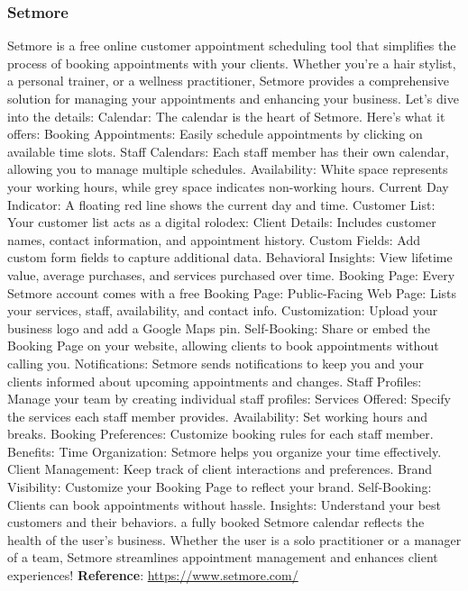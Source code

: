 \documentclass{article}
\begin{document}
      \subsubsection{Setmore}
      Setmore is a free online customer appointment scheduling tool that simplifies the process of booking appointments with your clients. Whether you’re a hair stylist, a personal trainer, or a wellness practitioner, Setmore provides a comprehensive solution for managing your appointments and enhancing your business. Let’s dive into the details:
      Calendar:
      The calendar is the heart of Setmore. Here’s what it offers:
      Booking Appointments: Easily schedule appointments by clicking on available time slots.
      Staff Calendars: Each staff member has their own calendar, allowing you to manage multiple schedules.
      Availability: White space represents your working hours, while grey space indicates non-working hours.
      Current Day Indicator: A floating red line shows the current day and time.
      Customer List:
      Your customer list acts as a digital rolodex:
      Client Details: Includes customer names, contact information, and appointment history.
      Custom Fields: Add custom form fields to capture additional data.
      Behavioral Insights: View lifetime value, average purchases, and services purchased over time.
      Booking Page:
      Every Setmore account comes with a free Booking Page:
      Public-Facing Web Page: Lists your services, staff, availability, and contact info.
      Customization: Upload your business logo and add a Google Maps pin.
      Self-Booking: Share or embed the Booking Page on your website, allowing clients to book appointments without calling you.       
      Notifications:
      Setmore sends notifications to keep you and your clients informed about upcoming appointments and changes.
      Staff Profiles:
      Manage your team by creating individual staff profiles:
      Services Offered: Specify the services each staff member provides.
      Availability: Set working hours and breaks.
      Booking Preferences: Customize booking rules for each staff member.
      Benefits:
      Time Organization: Setmore helps you organize your time effectively.
      Client Management: Keep track of client interactions and preferences.
      Brand Visibility: Customize your Booking Page to reflect your brand.
      Self-Booking: Clients can book appointments without hassle.
      Insights: Understand your best customers and their behaviors.
      a fully booked Setmore calendar reflects the health of the user’s business. Whether the user is a solo practitioner or a manager of a team, Setmore streamlines appointment management and enhances client experiences!\newline
      \textbf{Reference}: \href{https://www.setmore.com/}{https://www.setmore.com/}
      
\end{document}
